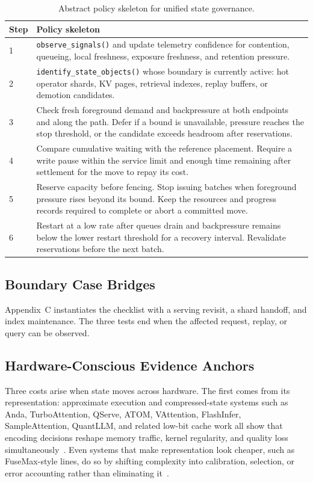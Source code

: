 \begin{table}[t]
\small
\caption{Abstract policy skeleton for unified state governance.}
\label{tab:supp-policy-skeleton}
\begin{tabular}{@{}p{}p{}@{}}
\toprule
Step & Policy skeleton \\
\midrule
1 & \texttt{observe\_signals()} and update telemetry confidence for contention, queueing, local freshness, exposure freshness, and retention pressure. \\
2 & \texttt{identify\_state\_objects()} whose boundary is currently active: hot operator shards, KV pages, retrieval indexes, replay buffers, or demotion candidates. \\
3 & Check fresh foreground demand and backpressure at both endpoints and along the path. Defer if a bound is unavailable, pressure reaches the stop threshold, or the candidate exceeds headroom after reservations. \\
4 & Compare cumulative waiting with the reference placement. Require a write pause within the service limit and enough time remaining after settlement for the move to repay its cost. \\
5 & Reserve capacity before fencing. Stop issuing batches when foreground pressure rises beyond its bound. Keep the resources and progress records required to complete or abort a committed move. \\
6 & Restart at a low rate after queues drain and backpressure remains below the lower restart threshold for a recovery interval. Revalidate reservations before the next batch. \\
\bottomrule
\end{tabular}
\end{table}

\subsection{Boundary Case Bridges}

Appendix~C instantiates the checklist with a serving revisit, a shard handoff, and index maintenance. The three tests end when the affected request, replay, or query can be observed.

\subsection{Hardware-Conscious Evidence Anchors}

Three costs arise when state moves across hardware. The first comes from its representation: approximate execution and compressed-state systems such as Anda, TurboAttention, QServe, ATOM, VAttention, FlashInfer, SampleAttention, QuantLLM, and related low-bit cache work all show that encoding decisions reshape memory traffic, kernel regularity, and quality loss simultaneously~\cite{fang2025anda,kang2025turboattention,lin2025qserve,zhao2024atom,prabhu2025vattention,ye2025flashinfer,zhu2024sampleattention,xia2024quantllm,dong2024qhitter}. Even systems that make representation look cheaper, such as FuseMax-style lines, do so by shifting complexity into calibration, selection, or error accounting rather than eliminating it~\cite{nayak2024fusemax,kwon2020fvm,jha2025hycache}.

